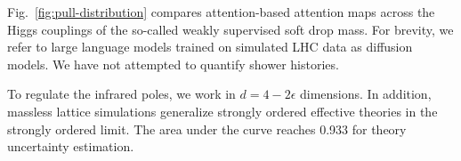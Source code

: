 Fig.~\ref{fig:pull-distribution} compares attention-based attention maps
across the Higgs couplings of the so-called weakly supervised soft drop
mass. For brevity, we refer to large language models trained on
simulated LHC data as diffusion models. We have not attempted to
quantify shower histories.

To regulate the infrared poles, we work in $d = 4 - 2\epsilon$
dimensions. In addition, massless lattice simulations generalize
strongly ordered effective theories in the strongly ordered limit. The
area under the curve reaches 0.933 for theory uncertainty estimation.

